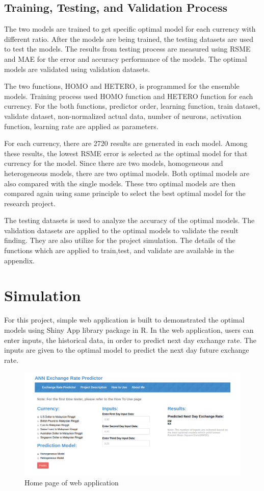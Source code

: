 \subsection{Training, Testing, and Validation Process}

The two models are trained to get specific optimal model for each currency with different ratio. After the models are being trained, the testing datasets are used to test the models. The results from testing process are measured using RSME and MAE for the error and accuracy performance of the models. The optimal models are validated using validation datasets.

The two functions, HOMO and HETERO, is programmed for the ensemble models. Training process used  HOMO function and  HETERO function for each currency. For the both functions, predictor order, learning function, train dataset, validate dataset, non-normalized actual data, number of neurons, activation function, learning rate are applied as parameters.

For each currency, there are 2720 results are generated in each model. Among these results, the lowest RSME error is selected as the optimal model for that currency for the model. Since there are two models, homogeneous and heterogeneous models, there are two optimal models. Both optimal models are also compared with the single models. These two optimal models are then compared again using same principle to select the best optimal model for the research project.

The testing datasets is used to analyze the accuracy of the optimal models. The validation datasets are applied to the optimal models to validate the result finding. They are also utilize for the project simulation. The details of the functions which are applied to train,test, and validate are available in the appendix.
\pagebreak


\section{Simulation}

For this project, simple web application is built to demonstrated the optimal models using Shiny App library package in R. In the web application, users can enter inputs, the historical data, in order to predict next day exchange rate. The inputs are given to the optimal model to predict the next day future exchange rate. 

\begin{figure}[hbt!]\centering
	\includegraphics[width=1.1\textwidth]{main}
	\caption{Home page of web application }
\end{figure}

